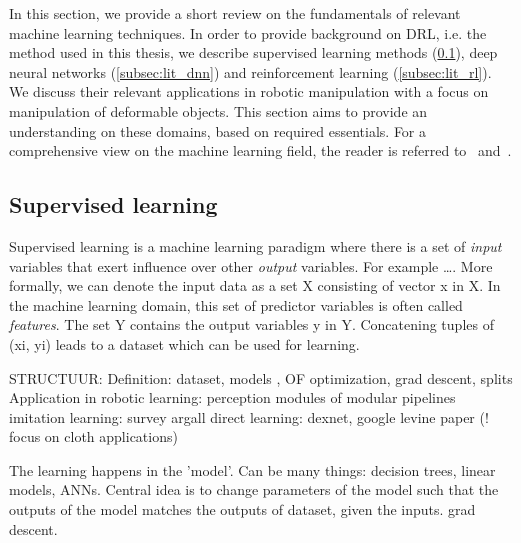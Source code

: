 \documentclass[\home/main.tex]{subfiles}
\begin{document}
In this section, we provide a short review on the fundamentals of relevant machine learning techniques. In order to provide background on \acrfull{DRL}, i.e. the method used in this thesis, we describe supervised learning methods (\cref{subsec:lit_sl}), deep neural networks (\cref{subsec:lit_dnn}) and reinforcement learning (\cref{subsec:lit_rl}). We discuss their relevant applications in robotic manipulation with a focus on manipulation of deformable objects. This section aims to provide an understanding on these domains, based on required essentials. For a comprehensive view on the machine learning field, the reader is referred to~\autocite{Friedman2001} and~\autocite{Bishop2006}.

\subsection{Supervised learning} \label{subsec:lit_sl}




Supervised learning is a machine learning paradigm where there is a set of \textit{input} variables that exert influence over other \textit{output} variables. For example \dots. More formally, we can denote the input data as a set X consisting of vector x in X. In the machine learning domain, this set of predictor variables is often called \textit{features}. The set Y contains the output variables y in Y. Concatening tuples of (xi, yi) leads to a dataset which can be used for learning. 

STRUCTUUR:
	Definition: dataset, models , OF optimization, grad descent, splits 
	Application in robotic learning:
		perception modules of modular pipelines
		imitation learning: survey argall 
		direct learning: dexnet, google levine paper 
		(! focus on cloth applications)


The learning happens in the 'model'. Can be many things: decision trees, linear models, ANNs. 
Central idea is to change parameters of the model such that the outputs of the model matches the outputs of dataset, given the inputs. 
grad descent. 
\end{document}
